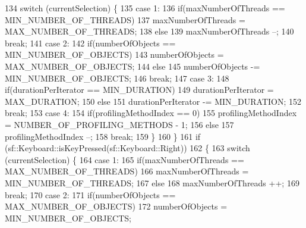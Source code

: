 \begin{DoxyCodeInclude}
134                 \textcolor{keywordflow}{switch} (currentSelection) \{
135                     \textcolor{keywordflow}{case} 1:
136                         \textcolor{keywordflow}{if}(maxNumberOfThreads == MIN\_NUMBER\_OF\_THREADS)
137                             maxNumberOfThreads = MAX\_NUMBER\_OF\_THREADS;
138                         \textcolor{keywordflow}{else}
139                             maxNumberOfThreads --;
140                         \textcolor{keywordflow}{break};
141                     \textcolor{keywordflow}{case} 2:
142                         \textcolor{keywordflow}{if}(numberOfObjects == MIN\_NUMBER\_OF\_OBJECTS)
143                             numberOfObjects = MAX\_NUMBER\_OF\_OBJECTS;
144                         \textcolor{keywordflow}{else}
145                             numberOfObjects -= MIN\_NUMBER\_OF\_OBJECTS;
146                         \textcolor{keywordflow}{break};
147                     \textcolor{keywordflow}{case} 3:
148                         \textcolor{keywordflow}{if}(durationPerIterator == MIN\_DURATION)
149                             durationPerIterator = MAX\_DURATION;
150                         \textcolor{keywordflow}{else}
151                             durationPerIterator -= MIN\_DURATION;
152                         \textcolor{keywordflow}{break};
153                     \textcolor{keywordflow}{case} 4:
154                         \textcolor{keywordflow}{if}(profilingMethodIndex == 0)
155                             profilingMethodIndex = NUMBER\_OF\_PROFILING\_METHODS - 1;
156                         \textcolor{keywordflow}{else}
157                             profilingMethodIndex --;
158                         \textcolor{keywordflow}{break};
159                 \}
160             \}
161             \textcolor{keywordflow}{if} (sf::Keyboard::isKeyPressed(sf::Keyboard::Right))
162             \{
163                 \textcolor{keywordflow}{switch} (currentSelection) \{
164                     \textcolor{keywordflow}{case} 1:
165                         \textcolor{keywordflow}{if}(maxNumberOfThreads == MAX\_NUMBER\_OF\_THREADS)
166                             maxNumberOfThreads = MIN\_NUMBER\_OF\_THREADS;
167                         \textcolor{keywordflow}{else}
168                             maxNumberOfThreads ++;
169                         \textcolor{keywordflow}{break};
170                     \textcolor{keywordflow}{case} 2:
171                         \textcolor{keywordflow}{if}(numberOfObjects == MAX\_NUMBER\_OF\_OBJECTS)
172                             numberOfObjects = MIN\_NUMBER\_OF\_OBJECTS;

\end{DoxyCodeInclude}
